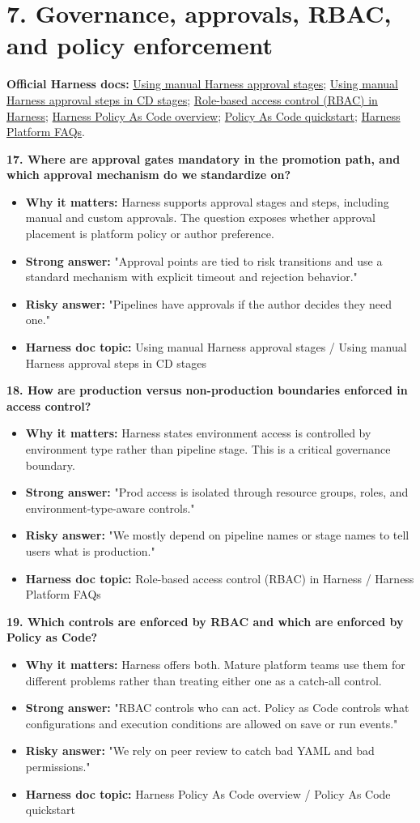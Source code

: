 \documentclass[11pt]{article}
\newcommand{\doccluster}[1]{%
  {\small\textcolor{AccentGray}{\textbf{Official Harness docs:} #1}}\par\vspace{0.4em}
}
\newcommand{\qblock}[5]{%
  \textbf{#1}\par
  \begin{itemize}[leftmargin=1.5em,itemsep=0.2em,topsep=0.3em]
    \item[--] \textbf{Why it matters:} #2
    \item[--] \textbf{Strong answer:} #3
    \item[--] \textbf{Risky answer:} #4
    \item[--] \textbf{Harness doc topic:} #5
  \end{itemize}
  \vspace{0.4em}
}
\begin{document}
\section*{7. Governance, approvals, RBAC, and policy enforcement}
\doccluster{\href{https://developer.harness.io/docs/platform/approvals/adding-harness-approval-stages}{Using manual Harness approval stages}; \href{https://developer.harness.io/docs/continuous-delivery/x-platform-cd-features/cd-steps/approvals/using-harness-approval-steps-in-cd-stages}{Using manual Harness approval steps in CD stages}; \href{https://developer.harness.io/docs/platform/role-based-access-control/rbac-in-harness/}{Role-based access control (RBAC) in Harness}; \href{https://developer.harness.io/docs/platform/governance/policy-as-code/harness-governance-overview}{Harness Policy As Code overview}; \href{https://developer.harness.io/docs/platform/governance/policy-as-code/harness-governance-quickstart/}{Policy As Code quickstart}; \href{https://developer.harness.io/docs/platform/harness-platform-faqs}{Harness Platform FAQs}.}

\qblock{17. Where are approval gates mandatory in the promotion path, and which approval mechanism do we standardize on?}{Harness supports approval stages and steps, including manual and custom approvals. The question exposes whether approval placement is platform policy or author preference.}{"Approval points are tied to risk transitions and use a standard mechanism with explicit timeout and rejection behavior."}{"Pipelines have approvals if the author decides they need one."}{Using manual Harness approval stages / Using manual Harness approval steps in CD stages}

\qblock{18. How are production versus non-production boundaries enforced in access control?}{Harness states environment access is controlled by environment type rather than pipeline stage. This is a critical governance boundary.}{"Prod access is isolated through resource groups, roles, and environment-type-aware controls."}{"We mostly depend on pipeline names or stage names to tell users what is production."}{Role-based access control (RBAC) in Harness / Harness Platform FAQs}

\qblock{19. Which controls are enforced by RBAC and which are enforced by Policy as Code?}{Harness offers both. Mature platform teams use them for different problems rather than treating either one as a catch-all control.}{"RBAC controls who can act. Policy as Code controls what configurations and execution conditions are allowed on save or run events."}{"We rely on peer review to catch bad YAML and bad permissions."}{Harness Policy As Code overview / Policy As Code quickstart}
\end{document}
